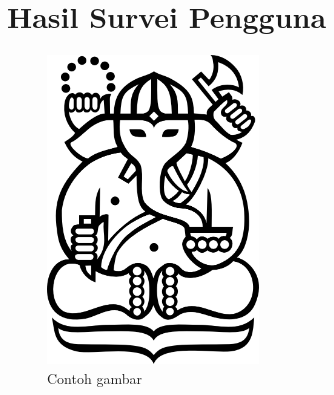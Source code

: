 \chapter{Hasil Survei Pengguna}

\begin{figure}[htbp]
	\centering
	\includegraphics[width=0.5\textwidth]{resources/cover-ganesha.jpg}
	\caption{Contoh gambar}
\end{figure}